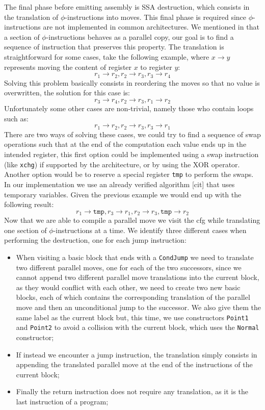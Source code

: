 The final phase before emitting assembly is SSA destruction, which consists in the translation of $\phi$-instructions into moves. This final phase is required since $\phi$-instructions are not implemented in common architectures.
We mentioned in  that a section of $\phi$-instructions behaves as a parallel copy, our goal is to find a sequence of instruction that preserves this property. The translation is straightforward for some cases, take the following example, where $x \to y$ represents moving the content of register $x$ to register $y$:
\[
  r_1 \to r_2, r_2 \to r_3, r_3 \to r_4
\]
Solving this problem basically consists in reordering the moves so that no value is overwritten, the solution for this case is:
\[
  r_3 \to r_4, r_2 \to r_3, r_1 \to r_2
\]
Unfortunately some other cases are non-trivial, namely those who contain loops such as:
\[
  r_1 \to r_2, r_2 \to r_3, r_3 \to r_1
\]
There are two ways of solving these cases, we could try to find a sequence of swap operations such that at the end of the computation each value ends up in the intended register, this first option could be implemented using a swap instruction (like \texttt{xchg}) if supported by the architecture, or by using the XOR operator. Another option would be to reserve a special register \texttt{tmp} to perform the swaps. In our implementation we use an already verified algorithm [cit] that uses temporary variables. Given the previous example we would end up with the following result:
\[
  r_1 \to \texttt{tmp}, r_3 \to r_1, r_2 \to r_3, \texttt{tmp} \to r_2
\]
Now that we are able to compile a parallel move we visit the \gls{cfg} while translating one section of $\phi$-instructions at a time.
We identify three different cases when performing the destruction, one for each jump instruction:
\begin{itemize}
  \item When visiting a basic block that ends with a \texttt{CondJump} we need to translate two different parallel moves, one for each of the two successors, since we cannot append two different parallel move translations into the current block, as they would conflict with each other, we need to create two new basic blocks, each of which contains the corresponding translation of the parallel move and then an unconditional jump to the successor. We also give them the same label as the current block but, this time, we use constructors \texttt{Point1} and \texttt{Point2} to avoid a collision with the current block, which uses the \texttt{Normal} constructor;
  \item If instead we encounter a jump instruction, the translation simply consists in appending the translated parallel move at the end of the instructions of the current block;
  \item Finally the return instruction does not require any translation, as it is the last instruction of a program;
\end{itemize}

